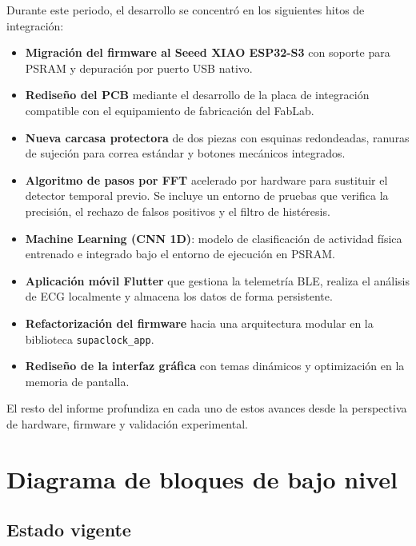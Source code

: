 \documentclass[letterpaper,11pt]{article}
\begin{document}
Durante este periodo, el desarrollo se concentró en los siguientes hitos de integración:
\begin{itemize}
    \item \textbf{Migración del firmware al Seeed XIAO ESP32-S3} con soporte para PSRAM y depuración por puerto USB nativo.
    \item \textbf{Rediseño del PCB} mediante el desarrollo de la placa de integración compatible con el equipamiento de fabricación del FabLab.
    \item \textbf{Nueva carcasa protectora} de dos piezas con esquinas redondeadas, ranuras de sujeción para correa estándar y botones mecánicos integrados.
    \item \textbf{Algoritmo de pasos por FFT} acelerado por hardware para sustituir el detector temporal previo. Se incluye un entorno de pruebas que verifica la precisión, el rechazo de falsos positivos y el filtro de histéresis.
    \item \textbf{Machine Learning (CNN 1D)}: modelo de clasificación de actividad física entrenado e integrado bajo el entorno de ejecución en PSRAM.
    \item \textbf{Aplicación móvil Flutter} que gestiona la telemetría BLE, realiza el análisis de ECG localmente y almacena los datos de forma persistente.
    \item \textbf{Refactorización del firmware} hacia una arquitectura modular en la biblioteca \texttt{supaclock\_app}.
    \item \textbf{Rediseño de la interfaz gráfica} con temas dinámicos y optimización en la memoria de pantalla.
\end{itemize}

El resto del informe profundiza en cada uno de estos avances desde la perspectiva de hardware, firmware y validación experimental.

\newpage

\section{Diagrama de bloques de bajo nivel}

\subsection{Estado vigente}
\end{document}
